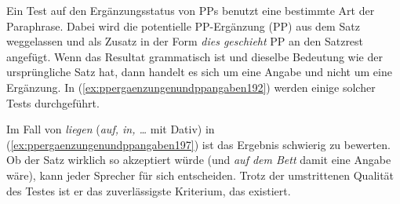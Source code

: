 Ein Test auf den Ergänzungsstatus von PPs benutzt eine bestimmte Art der Paraphrase.
Dabei wird die potentielle PP-Ergänzung (PP) aus dem Satz weggelassen und als Zusatz in der Form \textit{dies geschieht} PP an den Satzrest angefügt.
Wenn das Resultat grammatisch ist und dieselbe Bedeutung wie der ursprüngliche Satz hat, dann handelt es sich um eine Angabe und nicht um eine Ergänzung.
In (\ref{ex:ppergaenzungenundppangaben192}) werden einige solcher Tests durchgeführt.

\begin{exe}
  \ex\label{ex:ppergaenzungenundppangaben192}
  \begin{xlist}
  \end{xlist}
\end{exe}

Im Fall von \textit{liegen} (\textit{auf, in, \ldots} mit Dativ) in (\ref{ex:ppergaenzungenundppangaben197}) ist das Ergebnis schwierig zu bewerten.
Ob der Satz wirklich so akzeptiert würde (und \textit{auf dem Bett} damit eine Angabe wäre), kann jeder Sprecher für sich entscheiden.
Trotz der umstrittenen Qualität des Testes ist er das zuverlässigste Kriterium, das existiert.


